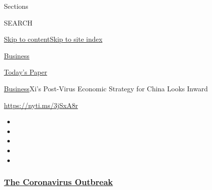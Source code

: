 Sections

SEARCH

\protect\hyperlink{site-content}{Skip to
content}\protect\hyperlink{site-index}{Skip to site index}

\href{https://www.nytimes3xbfgragh.onion/section/business}{Business}

\href{https://myaccount.nytimes3xbfgragh.onion/auth/login?response_type=cookie\&client_id=vi}{}

\href{https://www.nytimes3xbfgragh.onion/section/todayspaper}{Today's
Paper}

\href{/section/business}{Business}\textbar{}Xi's Post-Virus Economic
Strategy for China Looks Inward

\url{https://nyti.ms/3jSxA8r}

\begin{itemize}
\item
\item
\item
\item
\item
\end{itemize}

\hypertarget{the-coronavirus-outbreak}{%
\subsubsection{\texorpdfstring{\href{https://www.nytimes3xbfgragh.onion/news-event/coronavirus?name=styln-coronavirus-markets\&region=TOP_BANNER\&block=storyline_menu_recirc\&action=click\&pgtype=Article\&impression_id=d328da70-f1c6-11ea-b9e2-239474aa18e9\&variant=undefined}{The
Coronavirus
Outbreak}}{The Coronavirus Outbreak}}\label{the-coronavirus-outbreak}}

